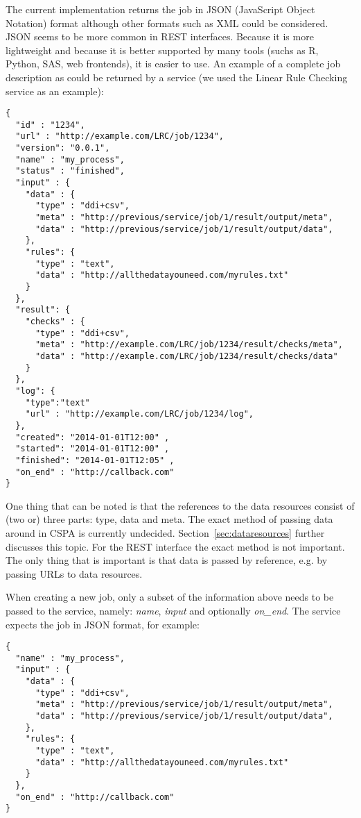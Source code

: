 \documentclass[a4paper]{article}
\begin{document}
The current implementation returns the job in JSON (JavaScript Object Notation)
format although other formats such as XML could be considered. JSON seems to be
more common in REST interfaces. Because it is more lightweight and because it is
better supported by many tools (suchs as R, Python, SAS, web frontends), it is
easier to use.  An example of a complete job description as could be returned by
a service (we used the Linear Rule Checking service as an example):
{\small
\begin{Verbatim}
{
  "id" : "1234",
  "url" : "http://example.com/LRC/job/1234",
  "version": "0.0.1",
  "name" : "my_process",
  "status" : "finished",
  "input" : {
    "data" : {
      "type" : "ddi+csv",
      "meta" : "http://previous/service/job/1/result/output/meta",
      "data" : "http://previous/service/job/1/result/output/data",
    },
    "rules": {
      "type" : "text",
      "data" : "http://allthedatayouneed.com/myrules.txt"
    }
  }, 
  "result": {
    "checks" : {
      "type" : "ddi+csv",
      "meta" : "http://example.com/LRC/job/1234/result/checks/meta",
      "data" : "http://example.com/LRC/job/1234/result/checks/data"
    }
  }, 
  "log": {
    "type":"text"
    "url" : "http://example.com/LRC/job/1234/log",
  },
  "created": "2014-01-01T12:00" ,
  "started": "2014-01-01T12:00" ,
  "finished": "2014-01-01T12:05" ,
  "on_end" : "http://callback.com"
}
\end{Verbatim}
}
One thing that can be noted is that the references to the data resources consist
of (two or) three parts: type, data and meta. The exact method of passing data
around in CSPA is currently undecided. Section~\ref{sec:dataresources} further
discusses this topic. For the REST interface the exact method is not important.
The only thing that is important is that data is passed by reference, e.g. by
passing URLs to data resources.

When creating a new job, only a subset of the information above needs to be
passed to the service, namely: \emph{name}, \emph{input} and optionally
\emph{on\_end}. The service expects the job in JSON format, for example:
{\small
\begin{Verbatim}
{
  "name" : "my_process",
  "input" : {
    "data" : {
      "type" : "ddi+csv",
      "meta" : "http://previous/service/job/1/result/output/meta",
      "data" : "http://previous/service/job/1/result/output/data",
    },
    "rules": {
      "type" : "text",
      "data" : "http://allthedatayouneed.com/myrules.txt"
    }
  }, 
  "on_end" : "http://callback.com"
}
\end{Verbatim}
}
\end{document}
